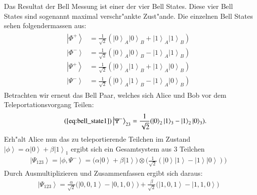 \begin{refsection}
Das Resultat der Bell Messung ist einer der vier Bell States. Diese vier Bell States sind sogenannt maximal verschr"ankte Zust"ande. Die einzelnen Bell States sehen folgendermassen aus:
\begin{align}
	\begin{split}
\left|\Phi^+\right\rangle & = \frac{1}{\sqrt{2}}(\left|0\right\rangle_{A}\left|0\right\rangle_{B} + \left|1\right\rangle_{A}\left|1\right\rangle_{B}) \\
\left|\Phi^-\right\rangle & = \frac{1}{\sqrt{2}}(\left|0\right\rangle_{A}\left|0\right\rangle_{B} - \left|1\right\rangle_{A}\left|1\right\rangle_{B}) \\
\left|\Psi^+\right\rangle & = \frac{1}{\sqrt{2}}(\left|0\right\rangle_{A}\left|1\right\rangle_{B} + \left|1\right\rangle_{A}\left|0\right\rangle_{B}) \\
\left|\Psi^-\right\rangle & = \frac{1}{\sqrt{2}}(\left|0\right\rangle_{A}\left|1\right\rangle_{B} - \left|1\right\rangle_{A}\left|0\right\rangle_{B}) 
	\end{split}
\end{align}
Betrachten wir erneut das Bell Paar, welches sich Alice und Bob vor dem Teleportationsvorgang Teilen:
\begin{align}  \tag{\ref{eq:bell_state1}}
 \left|\Psi^{-}\right\rangle_{23} = \frac{1}{\sqrt{2}} ( \left|0\right\rangle_{2}\left|1\right\rangle_{3} - \left|1\right\rangle_{2}\left|0\right\rangle_{3} ).
\end{align}
Erh"alt Alice nun das zu teleportierende Teilchen im Zustand $\left|\phi\right\rangle = \alpha\left|0\right\rangle + \beta\left|1\right\rangle_{1}$ ergibt sich ein Gesamtsystem aus 3 Teilchen
\begin{align}\label{eq:full_system1}
\left|\Psi_{123}\right\rangle = \left| \phi, \Psi^{-} \right\rangle = \big( \alpha \left| 0 \right\rangle + \beta \left| 1 \right\rangle \big) \otimes \big( \frac{1}{\sqrt{2}} ( \left|0\right\rangle \left|1\right\rangle - \left|1\right\rangle \left|0\right\rangle ) \big)
\end{align}
Durch Ausmultiplizieren und Zusammenfassen ergibt sich daraus:
\begin{align}\label{eq:full_system2}
\left|\Psi_{123}\right\rangle = \frac{\alpha}{\sqrt{2}} \big(\left|0, 0, 1 \right\rangle - \left|0, 1, 0 \right\rangle  \big) + \frac{\beta}{\sqrt{2}} \big(\left|1, 0, 1 \right\rangle - \left|1, 1, 0 \right\rangle \big)
\end{align}


\end{refsection}

